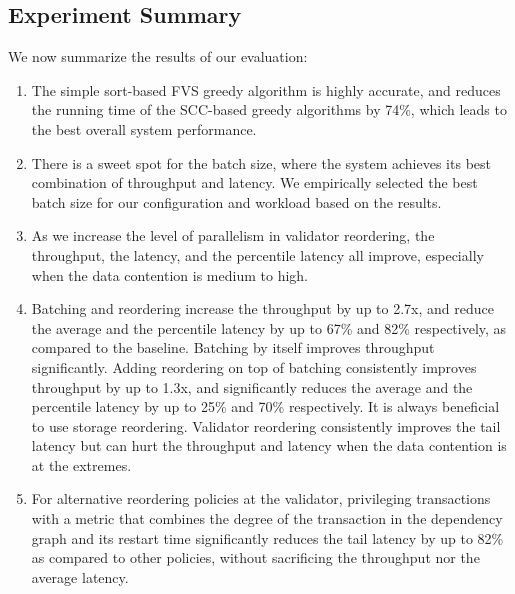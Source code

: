 






\subsection{Experiment Summary}

We now summarize the results of our evaluation:
\begin{enumerate}[leftmargin=*]
\item The simple sort-based FVS greedy algorithm is highly accurate, and reduces the running time of the SCC-based greedy algorithms by 74\%, which leads to the best overall system performance. 
\item There is a sweet spot for the batch size, where the system achieves its best combination of throughput and latency. We empirically selected the best batch size for our configuration and workload based on the results.
\item As we increase the level of parallelism in validator reordering, the throughput, the latency, and the percentile latency all improve, especially when the data contention is medium to high.
\item Batching and reordering increase the throughput by up to 2.7x, and reduce the average and the percentile latency by up to 67\% and 82\% respectively, as compared to the baseline. Batching by itself improves throughput significantly. Adding reordering on top of batching consistently improves throughput by up to 1.3x, and significantly reduces the average and the percentile latency by up to 25\% and 70\% respectively. It is always beneficial to use storage reordering. Validator reordering consistently improves the tail latency but can hurt the throughput and latency when the data contention is at the extremes.
\item For alternative reordering policies at the validator, privileging transactions with a metric that combines the degree of the transaction in the dependency graph and its restart time significantly reduces the tail latency by up to 82\% as compared to other policies, without sacrificing the throughput nor the average latency.

\end{enumerate}
